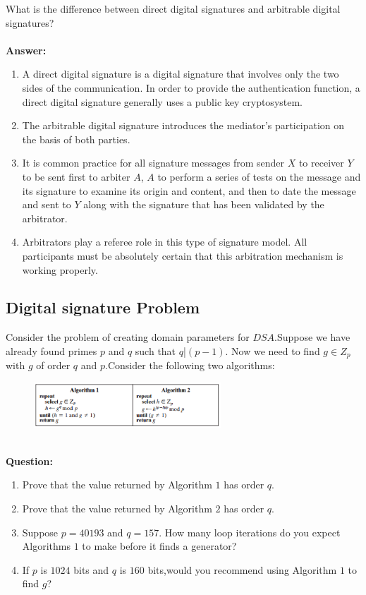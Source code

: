 \documentclass[paper=a4, fontsize=11pt]{scrartcl} %
\numberwithin{equation}{section} %
\numberwithin{figure}{section} %
\numberwithin{table}{section} %
\begin{document}
What is the difference between direct digital signatures and arbitrable digital signatures?
\\
\\
\textbf{Answer:}
\begin{enumerate}
\item A direct digital signature is a digital signature that involves only the two sides of the communication. In order to provide the authentication function, a direct digital signature generally uses a public key
    cryptosystem.
\item The arbitrable digital signature introduces the mediator's participation on the basis of both parties.
\item It is common practice for all signature messages from sender $X$ to receiver $Y$ to be sent first to arbiter $A$, $A$ to perform a series of tests on the message and its signature to examine its origin and content, and then to date the message and sent to $Y$ along with the signature that has been validated by the arbitrator.
\item Arbitrators play a referee role in this type of signature model. All participants must be absolutely certain that this arbitration mechanism is working properly.
\end{enumerate}


\subsection{Digital signature Problem \uppercase\expandafter{}}

Consider the problem of creating domain parameters for $DSA$.Suppose we have already found primes $p$ and $q$ such that $q$|$(p-1)$. Now we need to find $g \in Z$$_p$ with $g$ of order $q$ and $p$.Consider the following two algorithms:
\begin{figure}[htbp]
  \centering
  \includegraphics[width=7cm]{1.eps}
  \label{5-1}
\end{figure}
\\
\textbf{Question:}
\begin{enumerate}
\item Prove that the value returned by Algorithm $1$ has order $q$.
\item Prove that the value returned by Algorithm $2$ has order $q$.
\item Suppose $p = 40193$ and $q = 157$. How many loop iterations do you expect Algorithms $1$ to make before it finds a generator?
\item If $p$ is $1024$ bits and $q$ is $160$ bits,would you recommend using Algorithm $1$ to find $g$?
\end{enumerate}
\end{document}
